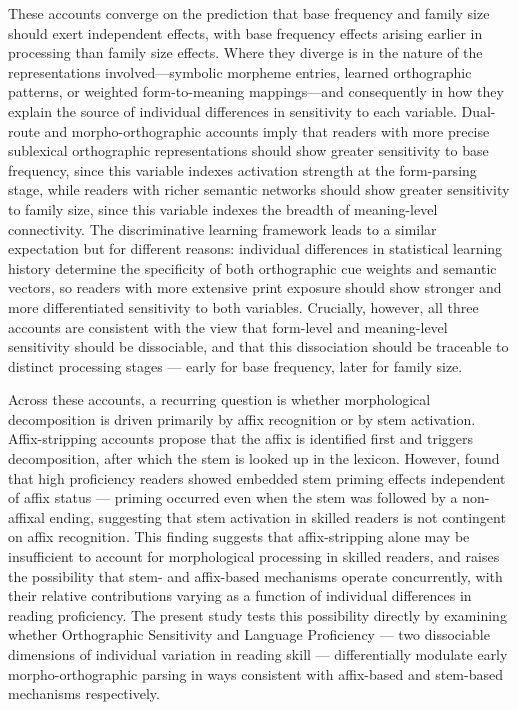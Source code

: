 \documentclass[utf8]{FrontiersinHarvard} %
\begin{document}
	
	These accounts converge on the prediction that base frequency and family size should exert independent effects, with base frequency effects arising earlier in processing than family size effects. Where they diverge is in the nature of the representations involved—symbolic morpheme entries, learned orthographic patterns, or weighted form-to-meaning mappings—and consequently in how they explain the source of individual differences in sensitivity to each variable. Dual-route and morpho-orthographic accounts imply that readers with more precise sublexical orthographic representations should show greater sensitivity to base frequency, since this variable indexes activation strength at the form-parsing stage, while readers with richer semantic networks should show greater sensitivity to family size, since this variable indexes the breadth of meaning-level connectivity. The discriminative learning framework leads to a similar expectation but for different reasons: individual differences in statistical learning history determine the specificity of both orthographic cue weights and semantic vectors, so readers with more extensive print exposure should show stronger and more differentiated sensitivity to both variables. Crucially, however, all three accounts are consistent with the view that form-level and meaning-level sensitivity should be dissociable, and that this dissociation should be traceable to distinct processing stages --- early for base frequency, later for family size. 
	
	Across these accounts, a recurring question is whether morphological decomposition is driven primarily by affix recognition or by stem activation. Affix-stripping accounts \citep{taft_lexical_1975, rastleMorphologicalDecompositionBased2008} propose that the affix is identified first and triggers decomposition, after which the stem is looked up in the lexicon. However, \citet{beyersmannEmbeddedStemPriming2016} found that high proficiency readers showed embedded stem priming effects independent of affix status --- priming occurred even when the stem was followed by a non-affixal ending, suggesting that stem activation in skilled readers is not contingent on affix recognition. This finding suggests that affix-stripping alone may be insufficient to account for morphological processing in skilled readers, and raises the possibility that stem- and affix-based mechanisms operate concurrently, with their relative contributions varying as a function of individual differences in reading proficiency. The present study tests this possibility directly by examining whether Orthographic Sensitivity and Language Proficiency --- two dissociable dimensions of individual variation in reading skill --- differentially modulate early morpho-orthographic parsing in ways consistent with affix-based and stem-based mechanisms respectively.
	
\end{document}
